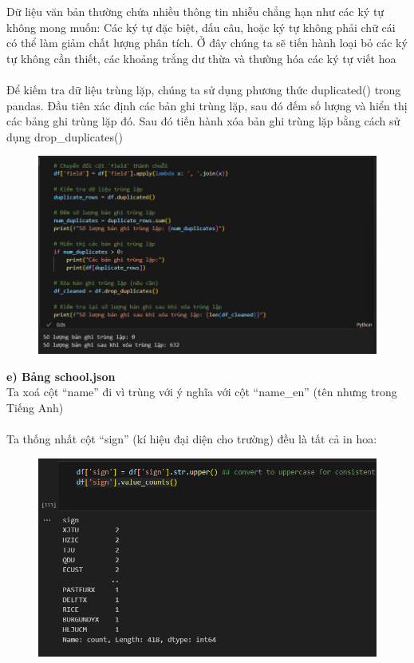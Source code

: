 Dữ liệu văn bản thường chứa nhiều thông tin nhiễu chẳng hạn như các ký tự không mong muốn: Các ký tự đặc biệt, dấu câu, hoặc ký tự không phải chữ cái có thể làm giảm chất lượng phân tích. Ở đây chúng ta sẽ tiến hành loại bỏ các ký tự không cần thiết, các khoảng trắng dư thừa và thường hóa các ký tự viết hoa\\
\\
Để kiếm tra dữ liệu trùng lặp, chúng ta sử dụng phương thức duplicated() trong pandas. Đầu tiên xác định các bản ghi trùng lặp, sau đó đếm số lượng và hiển thị các bảng ghi trùng lặp đó. Sau đó tiến hành xóa bản ghi trùng lặp bằng cách sử dụng drop\_duplicates()
\newpage
\begin{figure}
    \centering
    \includegraphics[width=1\linewidth]{figures/49.png}
\end{figure}
\textbf{e) Bảng school.json}\\
Ta xoá cột “name” đi vì trùng với ý nghĩa với cột “name\_en” (tên nhưng trong Tiếng Anh)\\
\\
Ta thống nhất cột “sign” (kí hiệu đại diện cho trường) đều là tất cả in hoa:
\newpage
\begin{figure}
    \centering
    \includegraphics[width=0.7\linewidth]{figures/50.png}
\end{figure}
